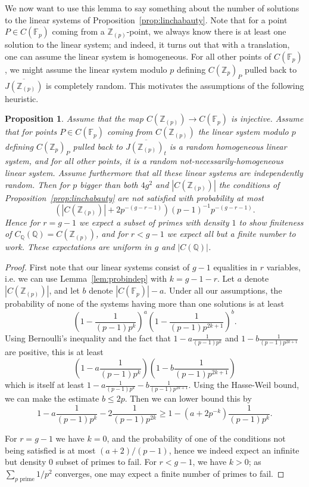 \documentclass[12pt]{article}
\newcommand{\Z}{\mathbb{Z}}
\newcommand{\Q}{\mathbb{Q}}
\newcommand{\F}{\mathbb{F}}
\theoremstyle{plain}
\newtheorem{prop}[thm]{Proposition} %
\theoremstyle{definition}
\theoremstyle{remark}
\begin{document}
We now want to use this lemma to say something about the number of solutions to the linear systems of Proposition~\ref{prop:linchabauty}. Note that for a point $P \in C(\F_p)$ coming from a $\Z_{(p)}$-point, we always know there is at least one solution to the linear system; and indeed, it turns out that with a translation, one can assume the linear system is homogeneous. For all other points of $C(\F_p)$, we might assume the linear system modulo $p$ defining $C(\Z_p)_P$ pulled back to $\overline{J(\Z_{(p)})}$ is completely random. This motivates the assumptions of the following heuristic. 
\begin{prop}
\label{prop:probwork}
Assume that the map $C(\Z_{(p)}) \to C(\F_p)$ is injective. Assume that for points $P \in C(\F_p)$ coming from $C(\Z_{(p)})$ the linear system modulo $p$ defining $C(\Z_p)_P$ pulled back to $\overline{J(\Z_{(p)})_t}$ is a random homogeneous linear system, and for all other points, it is a random not-necessarily-homogeneous linear system. Assume furthermore that all these linear systems are independently random. Then for $p$ bigger than both $4g^2$ and $|C(\Z_{(p)})|$ the conditions of Proposition~\ref{prop:linchabauty} are not satisfied with probability at most
\[
(|C(\Z_{(p)})|+2p^{-(g-r-1)})(p-1)^{-1}p^{-(g-r-1)}.
\]
Hence for $r = g-1$ we expect a subset of primes with density $1$ to show finiteness of $C_\Q(\Q) = C(\Z_{(p)})$, and for $r < g-1$ we expect all but a finite number to work. These expectations are uniform in $g$ and $|C(\Q)|$.
\end{prop}
\begin{proof}
First note that our linear systems consist of $g-1$ equalities in $r$ variables, i.e. we can use Lemma~\ref{lem:probindep} with $k = g-1-r$. Let $a$ denote $|C(\Z_{(p)})|$, and let $b$ denote $|C(\F_p)|-a$. Under all our assumptions, the probability of none of the systems having more than one solutions is at least
\[
\left(1 - \frac{1}{(p-1)p^k}\right)^{a} \left(1 - \frac{1}{(p-1)p^{2k+1}}\right)^b.
\]
Using Bernoulli's inequality and the fact that $1- a\frac{1}{(p-1)p^k}$ and $1 - b\frac{1}{(p-1)p^{2k+1}}$ are positive, this is at least 
\[
\left(1- a\frac{1}{(p-1)p^k}\right)\left(1 - b\frac{1}{(p-1)p^{2k+1}}\right)
\]
which is itself at least $1 - a\frac{1}{(p-1)p^k} - b\frac{1}{(p-1)p^{2k+1}}$. Using the Hasse-Weil bound, we can make the estimate $b \leq 2p$. Then we can lower bound this by \[1 - a\frac{1}{(p-1)p^k} - 2\frac{1}{(p-1)p^{2k}} \geq 1 - (a+2p^{-k})\frac{1}{(p-1)p^k}.\]

For $r = g-1$ we have $k= 0$, and the probability of one of the conditions not being satisfied is at most $(a+2)/(p-1)$, hence we indeed expect an infinite but density $0$ subset of primes to fail. For $r < g-1$, we have $k > 0$; as $\sum_{p\text{ prime}} 1/p^2$ converges, one may expect a finite number of primes to fail.
\end{proof}
\end{document}
